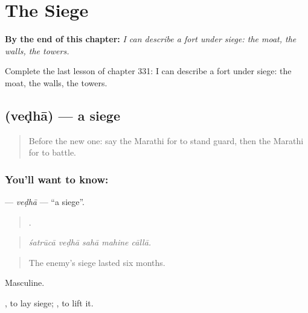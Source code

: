 
\chapter{The Siege}
\label{ch:mr-the-siege}

\begin{chapteropening}
\textbf{By the end of this chapter:} \emph{I can describe a fort under siege: the moat, the walls, the towers.}

Complete the last lesson of chapter 331: I can describe a fort under siege: the moat, the walls, the towers.
\end{chapteropening}

\section[\texorpdfstring{\mr{वेढा} (veḍhā)}{वेढा (veḍhā)}]{ (veḍhā) — a siege}

\label{lesson:MR-C331-vedha}



\begin{quote}
Before the new one: say the Marathi for to stand guard, then the Marathi for to battle.
\end{quote}

\subsection*{You'll want to know: }
\textbf{} — \emph{veḍhā} — \textquotedblleft{}a siege\textquotedblright{}.

\begin{quote}
    .
\end{quote}

\begin{quote}
\emph{śatrūcā veḍhā sahā mahine cāllā.}
\end{quote}

\begin{quote}
The enemy's siege lasted six months.
\end{quote}

Masculine.

 , to lay siege;  , to lift it.

